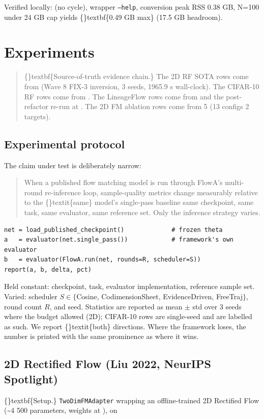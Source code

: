 \documentclass{article}
\begin{document}
Verified locally:  (no cycle), wrapper \texttt{--help}, conversion peak RSS 0.38 GB, N=100 under 24 GB cap yields \{\}textbf\{0.49 GB max\} (17.5 GB headroom).

\section{Experiments}
\begin{quote}
\{\}textbf\{Source-of-truth evidence chain.\} The 2D RF SOTA rows come from
 (Wave 8 FIX-3
inversion, 3 seeds, 1965.9 s wall-clock). The CIFAR-10 RF rows come
from . The LineageFlow rows come
from  and the post-refactor
re-run at . The 2D FM
ablation rows come from  5 (13
configs  2 targets).
\end{quote}
\subsection{Experimental protocol}
The claim under test is deliberately narrow:

\begin{quote}
When a published flow matching model is run through FlowA's
multi-round re-inference loop, sample-quality metrics change
measurably relative to the \{\}textit\{same\} model's single-pass baseline  same
checkpoint, same task, same evaluator, same reference set. Only the
inference strategy varies.
\end{quote}
\begin{verbatim}
net = load_published_checkpoint()             # frozen theta
a   = evaluator(net.single_pass())            # framework's own evaluator
b   = evaluator(FlowA.run(net, rounds=R, scheduler=S))
report(a, b, delta, pct)
\end{verbatim}
Held constant: checkpoint, task, evaluator implementation, reference sample set. Varied: scheduler $S \in \{$Cosine, CodimensionSheet, EvidenceDriven, FreeTraj$\}$, round count $R$, and seed. Statistics are reported as mean $\pm$ std over 3 seeds where the budget allowed (2D); CIFAR-10 rows are single-seed and are labelled as such. We report \{\}textit\{both\} directions. Where the framework loses, the number is printed with the same prominence as where it wins.

\subsection{2D Rectified Flow (Liu 2022, NeurIPS Spotlight)}
\{\}textbf\{Setup.\} \texttt{TwoDimFMAdapter} wrapping an offline-trained 2D Rectified Flow (\textasciitilde{}4 500 parameters, weights at ), on
\end{document}
